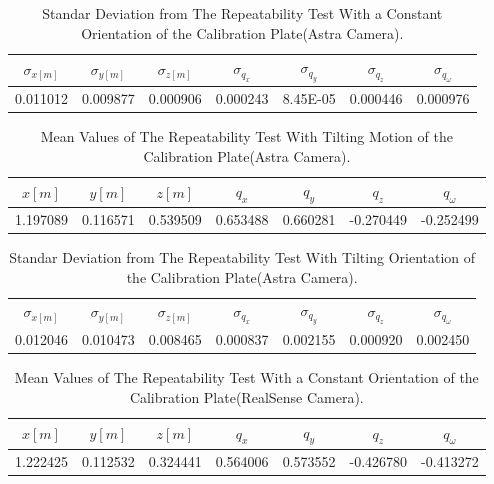 \begin{table}[b]
\renewcommand{\arraystretch}{1.3}
\caption{Standar Deviation from The Repeatability Test With a Constant Orientation of the Calibration Plate(Astra Camera).}
\label{standarastra1}
\centering
\begin{tabular}{|c||c||c||c||c||c||c|}
\hline
$\sigma_{x[m]}$ & $\sigma_{y[m]}$ & $\sigma_{z[m]}$ & $\sigma_{q_{x}}$ & $\sigma_{q_{y}}$ & $\sigma_{q_{z}}$ &$\sigma_{q_{\omega}}$ \\
\hline
0.011012&	0.009877	&0.000906&0.000243&	8.45E-05&	0.000446&	0.000976\\
\hline
\hline
\end{tabular}
\end{table}


\begin{table}[b]
\renewcommand{\arraystretch}{1.3}
\caption{Mean Values of The Repeatability Test With Tilting Motion of the Calibration Plate(Astra Camera).}
\label{meanastra2}
\centering
\begin{tabular}{|c||c||c||c||c||c||c|}
\hline
$x[m]$ & $y[m]$ & $z[m]$ & $q_{x}$ & $q_{y}$ & $q_{z}$ &$q_{\omega}$ \\
\hline
1.197089&	0.116571&	0.539509&
0.653488&	0.660281&	-0.270449&	-0.252499 \\
\hline
\hline
\end{tabular}
\end{table}


\begin{table}[b]
\renewcommand{\arraystretch}{1.3}
\caption{Standar Deviation from The Repeatability Test With Tilting Orientation of the Calibration Plate(Astra Camera).}
\label{standarastra2}
\centering
\begin{tabular}{|c||c||c||c||c||c||c|}
\hline
$\sigma_{x[m]}$ & $\sigma_{y[m]}$ & $\sigma_{z[m]}$ & $\sigma_{q_{x}}$ & $\sigma_{q_{y}}$ & $\sigma_{q_{z}}$ &$\sigma_{q_{\omega}}$ \\
0.012046&	0.010473&	0.008465& 0.000837&	0.002155&	0.000920&	0.002450
\\
\hline
\hline
\end{tabular}
\end{table}



\begin{table}[b]
\renewcommand{\arraystretch}{1.3}
\caption{Mean Values of The Repeatability Test With a Constant Orientation of the Calibration Plate(RealSense Camera).}
\label{meanreal1}
\centering
\begin{tabular}{|c||c||c||c||c||c||c|}
\hline
$x[m]$ & $y[m]$ & $z[m]$ & $q_{x}$ & $q_{y}$ & $q_{z}$ &$q_{\omega}$ \\
\hline
1.222425&	0.112532&	0.324441&0.564006&	0.573552&	-0.426780&	-0.413272 \\
\hline
\hline
\end{tabular}
\end{table}


